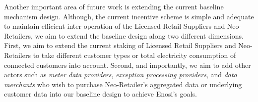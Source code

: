 \documentclass[a4paper,12pt,reqno]{amsart}
\theoremstyle{definition}
\begin{document}
Another important area of future work is extending the current baseline mechanism design. Although, the current incentive scheme is simple and adequate to maintain efficient inter-operation of the Licensed Retail Suppliers and Neo-Retailers, we aim to extend the baseline design along two different dimensions. First, we aim to extend the current staking of Licensed Retail Suppliers and Neo-Retailers to take different customer types or total electricity consumption of connected customers into account. Second, and importantly, we aim to add other actors such as \textit{meter data providers}, \textit{exception processing providers}, and \textit{data merchants} who wish to purchase Neo-Retailer's aggregated data or underlying customer data into our baseline design to achieve Enosi's goals. %
\end{document}

